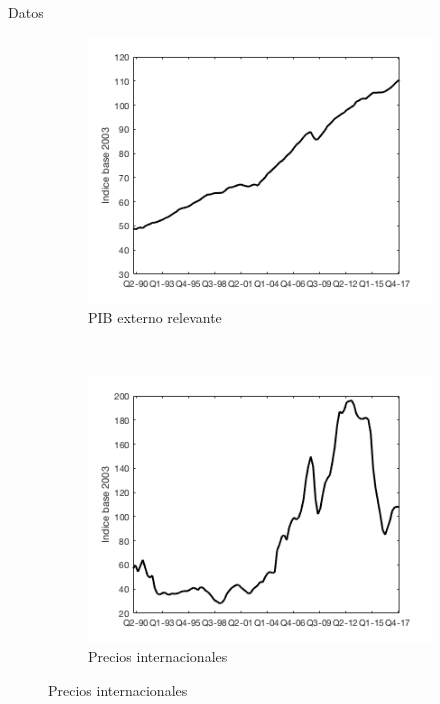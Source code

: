 \documentclass{beamer}
\begin{document}
\begin{frame}{Datos}
\begin{figure}
    \begin{subfigure}[b]{0.31\textwidth}
        \includegraphics[width=\textwidth]{14pieb}
        \caption{PIB externo relevante}
    \end{subfigure}
    ~ %
    \begin{subfigure}[b]{0.31\textwidth}
        \includegraphics[width=\textwidth]{15ippbx}
        \caption{Precios internacionales}
    \end{subfigure}
\end{figure}
\end{frame}
\end{document}

